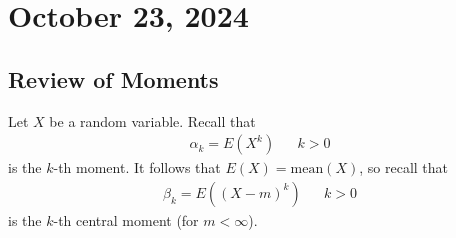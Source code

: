 \section{October 23, 2024}

\subsection{Review of Moments}
Let $X$ be a random variable. Recall that
\begin{align}
    \alpha_k = E(X^k) && k > 0
\end{align}
is the $k$-th moment. It follows that $E(X) = \text{mean}(X)$, so recall that
\begin{align}
    \beta_k = E((X - m)^k) && k > 0
\end{align}
is the $k$-th central moment (for $m < \infty$).

